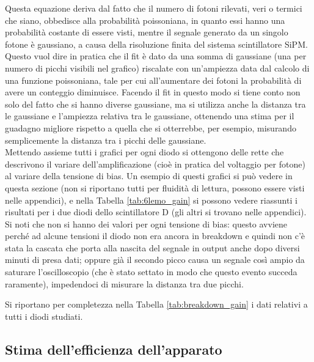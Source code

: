 Questa equazione deriva dal fatto che il numero di fotoni rilevati, veri o termici che siano, obbedisce alla probabilit\`a poissoniana, in quanto essi hanno una probabilit\`a costante di essere visti, mentre il segnale generato da un singolo fotone \`e gaussiano, a causa della risoluzione finita del sistema scintillatore SiPM. Questo vuol dire in pratica che il fit è dato da una somma di gaussiane (una per numero di picchi visibili nel grafico) riscalate con un'ampiezza data dal calcolo di una funzione poissoniana, tale per cui all'aumentare dei fotoni la probabilità di avere un conteggio
diminuisce. Facendo il fit in questo modo si tiene conto non solo del fatto che si hanno diverse gaussiane, ma si utilizza anche la distanza tra le gaussiane e  l'ampiezza
relativa tra le gaussiane, ottenendo una stima per il guadagno migliore rispetto a quella che si otterrebbe, per esempio, misurando semplicemente la distanza tra i picchi delle gaussiane.\\

Mettendo assieme tutti i grafici per ogni diodo si ottengono delle rette che descrivono il variare dell'amplificazione (cioè in pratica del voltaggio per fotone) al variare
della tensione di bias. Un esempio di questi grafici si può vedere in questa sezione (non si riportano tutti per fluidità di lettura, possono essere visti nelle appendici), e nella Tabella \ref{tab:6lemo_gain} si possono vedere riassunti i risultati per i due diodi dello scintillatore D (gli altri si trovano nelle appendici). Si noti che non si hanno dei valori per ogni tensione
di bias: questo avviene perché ad 	alcune tensioni il diodo non era ancora in breakdown e quindi non c'è stata la cascata che porta alla nascita del segnale in output anche dopo diversi minuti di presa dati; oppure gi\`a il secondo picco causa un segnale così ampio da saturare l'oscilloscopio (che è stato settato in modo che questo evento succeda raramente), impedendoci di misurare la distanza tra due picchi.

Si riportano per completezza nella Tabella \ref{tab:breakdown_gain} i dati relativi a tutti i diodi studiati.


\subsection{Stima dell'efficienza dell'apparato}
\label{sec:efficiency}
